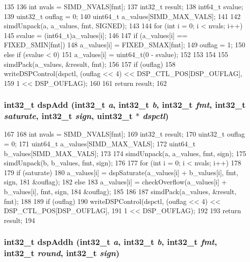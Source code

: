 \begin{DoxyCode}
135 {
136     int nvals = SIMD_NVALS[fmt];
137     int32_t result;
138     int64_t svalue;
139     uint32_t ouflag = 0;
140     uint64_t a_values[SIMD_MAX_VALS];
141 
142     simdUnpack(a, a_values, fmt, SIGNED);
143 
144     for (int i = 0; i < nvals; i++) {
145         svalue = (int64_t)a_values[i];
146 
147         if (a_values[i] == FIXED_SMIN[fmt]) {
148             a_values[i] = FIXED_SMAX[fmt];
149             ouflag = 1;
150         } else if (svalue < 0) {
151             a_values[i] = uint64_t(0 - svalue);
152         }
153     }
154 
155     simdPack(a_values, &result, fmt);
156 
157     if (ouflag)
158         writeDSPControl(dspctl, (ouflag << 4) << DSP_CTL_POS[DSP_OUFLAG],
159                         1 << DSP_OUFLAG);
160 
161     return result;
162 }
\end{DoxyCode}
\hypertarget{namespaceMipsISA_a705975465e26de40169cc93f7a09aa3b}{
\subsubsection[{dspAdd}]{\setlength{\rightskip}{0pt plus 5cm}int32\_\-t dspAdd (int32\_\-t {\em a}, \/  int32\_\-t {\em b}, \/  int32\_\-t {\em fmt}, \/  int32\_\-t {\em saturate}, \/  int32\_\-t {\em sign}, \/  {\bf uint32\_\-t} $\ast$ {\em dspctl})}}
\label{namespaceMipsISA_a705975465e26de40169cc93f7a09aa3b}



\begin{DoxyCode}
167 {
168     int nvals = SIMD_NVALS[fmt];
169     int32_t result;
170     uint32_t ouflag = 0;
171     uint64_t a_values[SIMD_MAX_VALS];
172     uint64_t b_values[SIMD_MAX_VALS];
173 
174     simdUnpack(a, a_values, fmt, sign);
175     simdUnpack(b, b_values, fmt, sign);
176 
177     for (int i = 0; i < nvals; i++)
178     {
179         if (saturate)
180             a_values[i] = dspSaturate(a_values[i] + b_values[i], fmt, sign,
181                                       &ouflag);
182         else
183             a_values[i] = checkOverflow(a_values[i] + b_values[i], fmt, sign,
184                                         &ouflag);
185     }
186 
187     simdPack(a_values, &result, fmt);
188 
189     if (ouflag)
190         writeDSPControl(dspctl, (ouflag << 4) << DSP_CTL_POS[DSP_OUFLAG],
191                         1 << DSP_OUFLAG);
192 
193     return result;
194 }
\end{DoxyCode}
\hypertarget{namespaceMipsISA_a6fd720eeab47ea9cf3354a636744e70c}{
\subsubsection[{dspAddh}]{\setlength{\rightskip}{0pt plus 5cm}int32\_\-t dspAddh (int32\_\-t {\em a}, \/  int32\_\-t {\em b}, \/  int32\_\-t {\em fmt}, \/  int32\_\-t {\em round}, \/  int32\_\-t {\em sign})}}
\label{namespaceMipsISA_a6fd720eeab47ea9cf3354a636744e70c}



